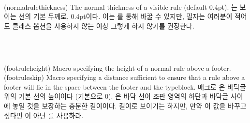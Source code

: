 \begin{syntax}
\lnc{\normalrulethickness} \\
\end{syntax}
\glossary(normalrulethickness)%
  {}%
  {The normal thickness of a visible rule (default 0.4pt).}
\lnc{\normalrulethickness}는 보이는 선의 기본
두께로, 0.4pt이다.
이는 \cmd{\setlength}를 통해 바꿀 수 있지만, 필자는 여러분이 적어도 \Lopt{14pt}
클래스 옵션을 사용하지 않는 이상 그렇게 하지 않기를 권장한다.

\begin{syntax}
\cmd{\footruleheight} \\
\cmd{\footruleskip} \\
\end{syntax}
\glossary(footruleheight)%
  {}%
  {Macro specifying the height of a normal rule above a footer.}
\glossary(footruleskip)%
  {}%
  {Macro specifying a distance sufficient to ensure that a rule above a footer
   will lie in the space between the footer and the typeblock.}
매크로 \cmd{\footruleheight}은 바닥글 위의 기본 선의
높이이다 (기본으로 0).
\cmd{\footruleskip}은 바닥 선이 조판 영역의 하단과
바닥글 사이에 놓일 것을 보장하는 충분한 길이이다.
길이로 보이기는 하지만, 만약 이 값을 바꾸고 싶다면 \cmd{\setlength}이 아닌
\cmd{\renewcommand}를 사용하라.

